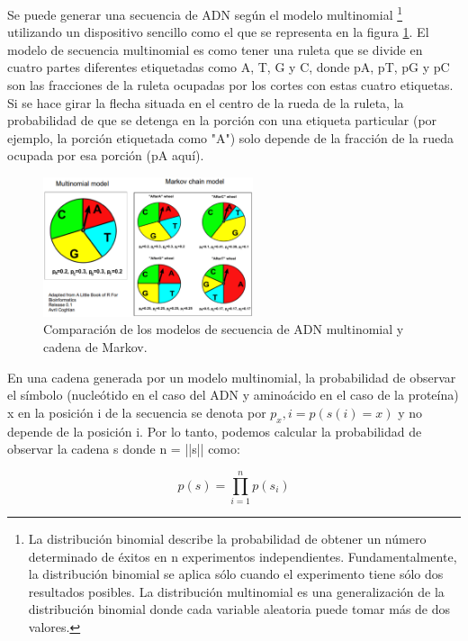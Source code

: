 Se puede generar una secuencia de ADN según el modelo multinomial \footnote{La distribución binomial describe la probabilidad de obtener un número determinado de éxitos en n experimentos independientes. Fundamentalmente, la distribución binomial se aplica sólo cuando el experimento tiene sólo dos resultados posibles. La distribución multinomial es una generalización de la distribución binomial donde cada variable aleatoria puede tomar más de dos valores.} utilizando un dispositivo sencillo como el que se representa en la figura \ref{fig:ruletas}. El modelo de secuencia multinomial es como tener una ruleta que se divide en cuatro partes diferentes etiquetadas como A, T, G y C, donde pA, pT, pG y pC son las fracciones de la ruleta ocupadas por los cortes con estas cuatro etiquetas. Si se hace girar la flecha situada en el centro de la rueda de la ruleta, la probabilidad de que se detenga en la porción con una etiqueta particular (por ejemplo, la porción etiquetada como "A") solo depende de la fracción de la rueda ocupada por esa porción (pA aquí).

\begin{figure}[htbp]
\centering
\includegraphics[width = 0.55\textwidth]{figs/ruletas.png}
\caption{Comparación de los modelos de secuencia de ADN multinomial y cadena de Markov. }
\label{fig:ruletas}
\end{figure}

En una cadena generada por un modelo multinomial, la probabilidad de observar el símbolo (nucleótido en el caso del ADN y aminoácido en el caso de la proteína) x en la posición i de la secuencia se denota por $p_x,i = p(s(i)=x)$ y no depende de la posición i. Por lo tanto, podemos calcular la probabilidad de observar la cadena s donde n = ||s|| como:

 $$ p(s) = \prod_{i=1}^{n} p(s_i) $$

